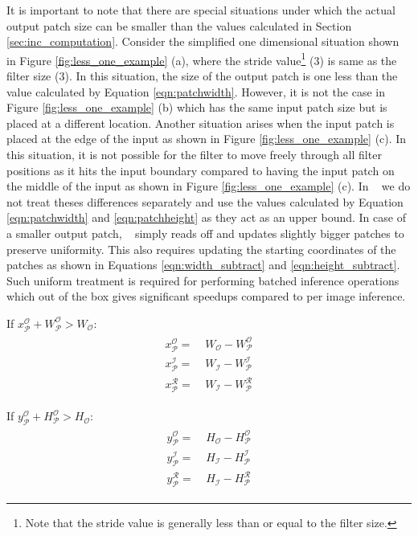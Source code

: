 It is important to note that there are special situations under which the actual output patch size can be smaller than the values calculated in Section \ref{sec:inc_computation}. Consider the simplified one dimensional situation shown in Figure \ref{fig:less_one_example} (a), where the stride value\footnote{Note that the stride value is generally less than or equal to the filter size.} (3) is same as the filter size (3). In this situation, the size of the output patch is one less than the value calculated by Equation \ref{eqn:patchwidth}. However, it is not the case in Figure \ref{fig:less_one_example} (b) which has the same input patch size but is placed at a different location.
Another situation arises when the input patch is placed at the edge of the input as shown in Figure \ref{fig:less_one_example} (c). In this situation, it is not possible for the filter to move freely through all filter positions as it hits the input boundary compared to having the input patch on the middle of the input as shown in Figure \ref{fig:less_one_example} (c).
In \system~ we do not treat theses differences separately and use the values calculated by Equation \ref{eqn:patchwidth} and \ref{eqn:patchheight} as they act as an upper bound. In case of a smaller output patch, \system~ simply reads off and updates slightly bigger patches to preserve uniformity.
This also requires updating the starting coordinates of the patches as shown in Equations \ref{eqn:width_subtract} and \ref{eqn:height_subtract}.
Such uniform treatment is required for performing batched inference operations which out of the box gives significant speedups compared to per image inference.

\vspace{2mm}
\hspace{4mm} If $x^\mathcal{O}_\mathcal{P} + W^\mathcal{O}_\mathcal{P} > W_{\mathcal{O}}:$
\begin{align}
\begin{split}
\label{eqn:width_subtract}
x^\mathcal{O}_\mathcal{P} = &~ W_{\mathcal{O}} - W^\mathcal{O}_\mathcal{P}\\
x^\mathcal{I}_\mathcal{P} = &~ W_{\mathcal{I}} - W^\mathcal{I}_\mathcal{P}\\
x^\mathcal{R}_\mathcal{P} = &~ W_{\mathcal{I}} - W^\mathcal{R}_\mathcal{P}
\end{split}
\end{align}

\hspace{4mm} If $y^\mathcal{O}_\mathcal{P} + H^\mathcal{O}_\mathcal{P} > H_{\mathcal{O}}:$
\begin{align}
\begin{split}
\label{eqn:height_subtract}
y^\mathcal{O}_\mathcal{P} = &~ H_{\mathcal{O}} - H^\mathcal{O}_\mathcal{P}\\
y^\mathcal{I}_\mathcal{P} = &~ H_{\mathcal{I}} - H^\mathcal{I}_\mathcal{P}\\
y^\mathcal{R}_\mathcal{P} = &~ H_{\mathcal{I}} - H^\mathcal{R}_\mathcal{P}
\end{split}
\end{align}

